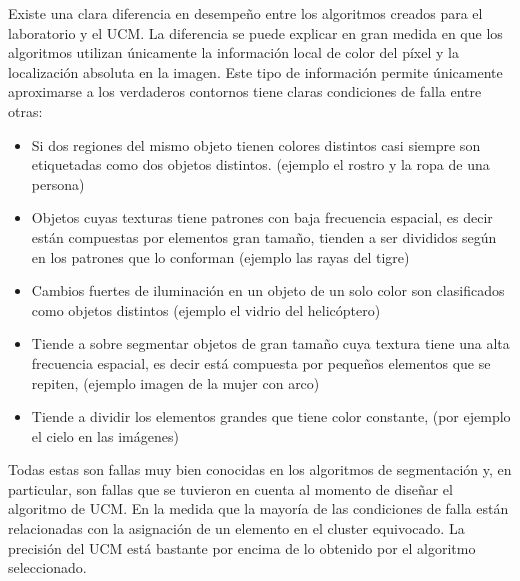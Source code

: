 \documentclass[10pt,twocolumn,letterpaper]{article}
\begin{document}
Existe una clara diferencia en desempeño entre los algoritmos creados para el laboratorio y el UCM. La diferencia se puede explicar en gran medida en que los algoritmos utilizan únicamente la información local de color del píxel y la localización absoluta en la imagen. Este tipo de información permite únicamente aproximarse a los verdaderos contornos  tiene claras condiciones de falla entre otras:
\begin{itemize}
\item Si dos regiones del mismo objeto tienen  colores distintos casi siempre son etiquetadas como dos objetos distintos. (ejemplo el rostro y la ropa de una persona)
\item  Objetos cuyas texturas tiene patrones con baja frecuencia espacial, es decir están compuestas por elementos gran tamaño, tienden a ser divididos según en los patrones que lo conforman (ejemplo las rayas del tigre)
\item Cambios fuertes de iluminación en un objeto de un solo color son clasificados como objetos distintos  (ejemplo el vidrio del helicóptero)
\item Tiende a sobre segmentar objetos de gran tamaño cuya textura tiene una alta frecuencia espacial, es decir está compuesta por pequeños elementos que se repiten, (ejemplo imagen de la mujer con arco)
\item Tiende a dividir los elementos grandes que tiene color constante, (por ejemplo el cielo en las imágenes)

\end{itemize}
Todas estas son fallas muy bien conocidas en los algoritmos de segmentación y, en particular, son fallas que se tuvieron en cuenta al momento de diseñar el algoritmo de UCM.
En la medida que la mayoría de las condiciones de falla están relacionadas con la asignación de un elemento en el cluster equivocado. La precisión del UCM está bastante por encima de lo obtenido por el algoritmo seleccionado.
\end{document}
